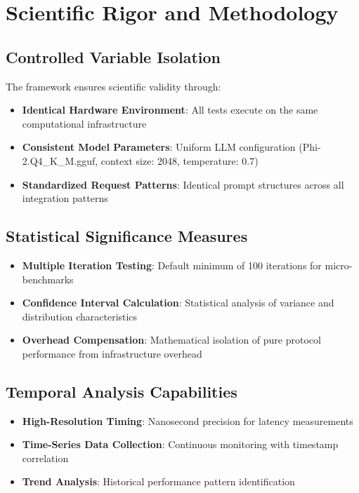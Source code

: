 \section{Scientific Rigor and Methodology}

\subsection{Controlled Variable Isolation}

The framework ensures scientific validity through:
\begin{itemize}
    \item \textbf{Identical Hardware Environment}: All tests execute on the same computational infrastructure
    \item \textbf{Consistent Model Parameters}: Uniform LLM configuration (Phi-2.Q4\_K\_M.gguf, context size: 2048, temperature: 0.7)
    \item \textbf{Standardized Request Patterns}: Identical prompt structures across all integration patterns
\end{itemize}

\subsection{Statistical Significance Measures}

\begin{itemize}
    \item \textbf{Multiple Iteration Testing}: Default minimum of 100 iterations for micro-benchmarks
    \item \textbf{Confidence Interval Calculation}: Statistical analysis of variance and distribution characteristics
    \item \textbf{Overhead Compensation}: Mathematical isolation of pure protocol performance from infrastructure overhead
\end{itemize}

\subsection{Temporal Analysis Capabilities}

\begin{itemize}
    \item \textbf{High-Resolution Timing}: Nanosecond precision for latency measurements
    \item \textbf{Time-Series Data Collection}: Continuous monitoring with timestamp correlation
    \item \textbf{Trend Analysis}: Historical performance pattern identification
\end{itemize}

